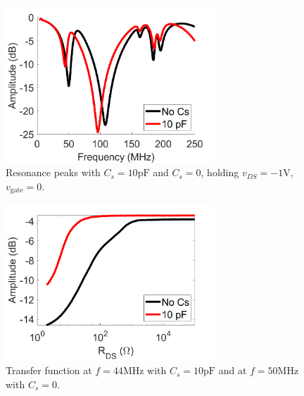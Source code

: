 \documentclass{article}
\begin{document}
\begin{figure}[H]
    \centering
    \includegraphics[width = 0.7\textwidth]{matlab_cs10_resonance.png}
    \caption{Resonance peaks with $C_s = 10\si{\pico\farad}$ and $C_s = 0$, holding $v_{DS} = -1\si{\volt}$, $v_\mathrm{gate}=0$.}
    \label{fig:cs10res}
\end{figure}
\begin{figure}[H]
    \centering
    \includegraphics[width = 0.7\textwidth]{matlab_cs10_transfer.png}
    \caption{Transfer function at $f = 44\si{\mega\hertz}$ with $C_s = 10\si{\pico\farad}$ and at $f=50\si{\mega\hertz}$ with $C_s = 0$.}
    \label{fig:cs10transfer}
\end{figure}
\end{document}
